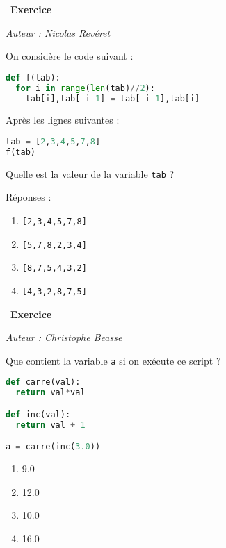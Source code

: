 \documentclass[
  11pt,
]{article}
\newcommand{\passthrough}[1]{#1}
\providecommand{\tightlist}{%
  \setlength{\itemsep}{0pt}\setlength{\parskip}{0pt}}
\newcounter{exo}
\newenvironment{exercice}[1]
{\par \medskip   \addtocounter{exo}{1} \noindent  
\begin{bclogo}[arrondi =0.1,   noborder = true, logo=\bccrayon, marge=4]{~\textbf{Exercice} \textbf{\theexo} {\itshape #1} }  \par}
{
\end{bclogo}
 \par \bigskip }
\newcounter{def}
\begin{document}
\begin{exercice}{}

\emph{Auteur : Nicolas Revéret}

On considère le code suivant :

\begin{lstlisting}[language=Python]
def f(tab):
  for i in range(len(tab)//2):
    tab[i],tab[-i-1] = tab[-i-1],tab[i]
\end{lstlisting}

Après les lignes suivantes :

\begin{lstlisting}[language=Python]
tab = [2,3,4,5,7,8]
f(tab)
\end{lstlisting}

Quelle est la valeur de la variable \passthrough{\lstinline!tab!} ?

Réponses :

\begin{enumerate}
\def\labelenumi{\Alph{enumi})}
\tightlist
\item
  \passthrough{\lstinline![2,3,4,5,7,8]!}
\item
  \passthrough{\lstinline![5,7,8,2,3,4]!}
\item
  \passthrough{\lstinline![8,7,5,4,3,2]!}
\item
  \passthrough{\lstinline![4,3,2,8,7,5]!}
\end{enumerate}

\end{exercice}

\begin{exercice}{}

\emph{Auteur : Christophe Beasse}

Que contient la variable \passthrough{\lstinline!a!} si on exécute ce
script ?

\begin{lstlisting}[language=Python]
def carre(val):
  return val*val

def inc(val):
  return val + 1

a = carre(inc(3.0))
\end{lstlisting}

\begin{enumerate}
\def\labelenumi{\Alph{enumi})}
\tightlist
\item
  9.0
\item
  12.0
\item
  10.0
\item
  16.0
\end{enumerate}

\end{exercice}
\end{document}
